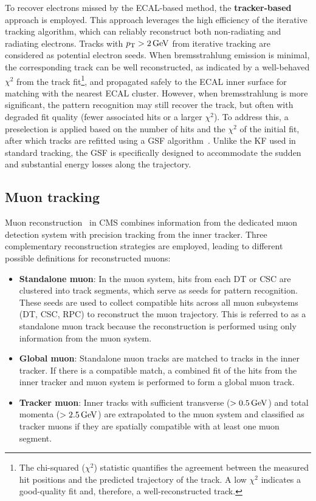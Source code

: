 To recover electrons missed by the \ac{ECAL}-based method, the \textbf{tracker-based} approach is employed. This approach leverages the high efficiency of the iterative tracking algorithm, which can reliably reconstruct both non-radiating and radiating electrons. Tracks with $p_\mathrm{T} > 2\,\text{Ge\hspace{-.08em}V}$ from iterative tracking are considered as potential electron seeds. When bremsstrahlung emission is minimal, the corresponding track can be well reconstructed, as indicated by a well-behaved $\chi^2$ from the track fit\footnote{The chi-squared ($\chi^2$) statistic quantifies the agreement between the measured hit positions and the predicted trajectory of the track. A low $\chi^2$ indicates a good-quality fit and, therefore, a well-reconstructed track.}, and propagated safely to the \ac{ECAL} inner surface for matching with the nearest \ac{ECAL} cluster. However, when bremsstrahlung is more significant, the pattern recognition may still recover the track, but often with degraded fit quality (\ie fewer associated hits or a larger $\chi^2$). To address this, a preselection is applied based on the number of hits and the $\chi^2$ of the initial fit, after which tracks are refitted using a \ac{GSF} algorithm~\cite{GSF_Algorithm}. Unlike the KF used in standard tracking, the GSF is specifically designed to accommodate the sudden and substantial energy losses along the trajectory.

\subsection{Muon tracking}

Muon reconstruction~\cite{ParticleFlow} in \ac{CMS} combines information from the dedicated muon detection system with precision tracking from the inner tracker. Three complementary reconstruction strategies are employed, leading to different possible definitions for reconstructed muons:

\begin{itemize}
    \item \textbf{Standalone muon}: In the muon system, hits from each \ac{DT} or \ac{CSC} are clustered into track segments, which serve as seeds for pattern recognition. These seeds are used to collect compatible hits across all muon subsystems (\ac{DT}, \ac{CSC}, \ac{RPC}) to reconstruct the muon trajectory. This is referred to as a standalone muon track because the reconstruction is performed using only information from the muon system.
    \item \textbf{Global muon}: Standalone muon tracks are matched to tracks in the inner tracker. If there is a compatible match, a combined fit of the hits from the inner tracker and muon system is performed to form a global muon track.
    \item \textbf{Tracker muon}: Inner tracks with sufficient transverse ($> 0.5\,\text{Ge\hspace{-.08em}V}$) and total momenta ($>2.5\,\text{Ge\hspace{-.08em}V}$) are extrapolated to the muon system and classified as tracker muons if they are spatially compatible with at least one muon segment.
\end{itemize}

